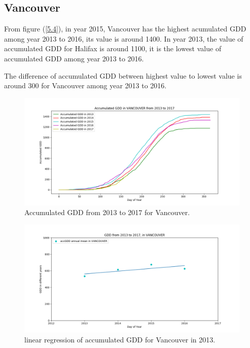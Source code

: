 \documentclass[12pt]{article}
\begin{document}
\subsection{Vancouver}


From figure (\ref{5.4}), in year 2015, Vancouver has the highest acumulated GDD among year 2013 to 2016, its value is around 1400. In year 2013, the value of accumulated GDD for Halifax is around 1100, it is the lowest value of accumulated GDD among year 2013 to 2016. 

The difference of accumulated GDD between highest value to lowest value is around 300 for Vancouver among year 2013 to 2016.
\begin{center}
\begin{figure}[H]
\includegraphics[width=5.25in]{../Plot/VANCOUVER/accGDD_2013_2017.png}




\caption{Accumulated GDD from 2013 to 2017 for Vancouver.}
\label{15}
\end{figure}
\end{center}

\begin{center}
\begin{figure}[H]
\includegraphics[width=5.25in]{../Plot/VANCOUVER/GDD_LinearRegression_VANCOUVER.png}
\caption{linear regression of accumulated GDD for Vancouver in 2013.}
\label{16}
\end{figure}
\end{center}
\end{document}
